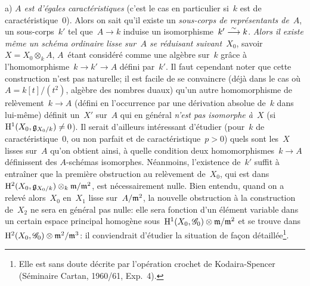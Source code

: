 a) \emph{$A$ est \og d'égales caractéristiques\fg} (c'est le cas
en particulier si~$k$ est de caract\'eristique~$0$). Alors on sait
qu'il existe un \emph{sous-corps de représentants de}~$A$, \ie
un sous-corps~$k'$ tel que~$A\to k$ induise un isomorphisme~$k'\overset{\sim}{\longrightarrow}
k$. \emph{Alors il existe même un schéma ordinaire lisse
sur~$A$ se réduisant suivant~$X_0$}, savoir~$X=X_0\otimes_kA$, $A$~\'etant consid\'er\'e comme une alg\`ebre sur~$k$ gr\^ace
\`a l'homomorphisme~$k\to k'\to A$ d\'efini par~$k'$. Il faut
cependant noter que cette construction n'est pas \og naturelle\fg; il est
facile de se convaincre (d\'ej\`a dans le cas
o\`u~$A=k[t]/(t^2)$, alg\`ebre des nombres duaux) qu'un autre
homomorphisme de rel\`evement~$k\to A$ (d\'efini en l'occurrence
par une d\'erivation absolue de~$k$ dans lui-m\^eme) d\'efinit
un~$X'$ sur~$A$ qui en g\'en\'eral \emph{n'est pas isomorphe
à~$X$} (si~$\mathrm{H}^1(X_0,\mathfrak{g}_{X_0/k})\neq0$). Il serait
d'ailleurs int\'eressant d'\'etudier (pour~$k$ de
caract\'eristique~$0$, ou non parfait et de
caract\'eristique~$p>0$) quels sont
les~$X$ lisses sur~$A$ qu'on obtient ainsi, \`a quelle condition
deux homomorphismes~$k\to A$ d\'efinissent des $A$-sch\'emas
isomorphes. N\'eanmoins, l'existence de~$k'$ suffit \`a
entra\^iner que la premi\`ere obstruction au rel\`evement
de~$X_0$, qui est
dans~$\mathrm{H}^2(X_0,\mathfrak{g}_{X_0/k})\otimes_k\mathfrak{m}/\mathfrak{m}^2$, est
n\'ecessairement nulle. Bien entendu, quand on a relev\'e
alors~$X_0$ en~$X_1$ lisse sur~$A/\mathfrak{m}^2$, la nouvelle obstruction
\`a la construction de~$X_2$ ne sera en g\'en\'eral pas nulle:
elle sera fonction d'un \'el\'ement variable dans un certain
espace principal homog\`ene
sous~$\H^1(X_0,\cal{G}_0)\otimes\goth{m}/\goth{m}^2$ et se trouve
dans~$\H^2(X_0,\cal{G}_0)\otimes\goth{m}^2/\goth{m}^3$: il
conviendrait d'\'etudier la situation de fa\c con
d\'etaill\'ee\footnote{Elle est sans doute d\'ecrite par
l'op\'eration crochet de Kodaira-Spencer (\cf S\'eminaire Cartan,
1960/61, Exp.\, 4).}.

